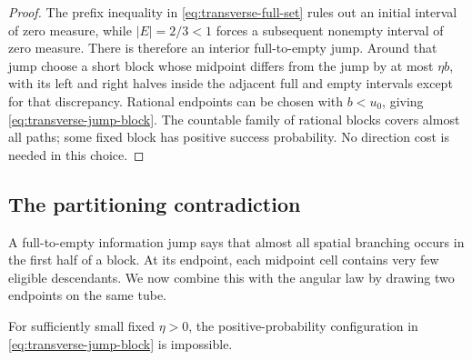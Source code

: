 \begin{proof}
The prefix inequality in \eqref{eq:transverse-full-set} rules out
an initial interval of zero measure, while $|E|=2/3<1$ forces a
subsequent nonempty interval of zero measure.  There is therefore
an interior full-to-empty jump.  Around that jump choose a short
block whose midpoint differs from the jump by at most $\eta b$,
with its left and right halves inside the adjacent full and empty
intervals except for that discrepancy.  Rational endpoints can be
chosen with $b<u_0$, giving \eqref{eq:transverse-jump-block}.
The countable family of rational blocks covers almost all paths;
some fixed block has positive success probability.  No direction
cost is needed in this choice.
\end{proof}

\subsection{The partitioning contradiction}

A full-to-empty information jump says that almost all spatial branching
occurs in the first half of a block.  At its endpoint, each midpoint
cell contains very few eligible descendants.  We now combine this
with the angular law by drawing two endpoints on the same tube.

\begin{lemma}\label{lem:transverse-no-jump}
For sufficiently small fixed $\eta>0$, the positive-probability
configuration in \eqref{eq:transverse-jump-block} is impossible.
\end{lemma}

